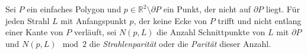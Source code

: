 \begin{definition}
    Sei $P$ ein einfaches Polygon und $p \in \mathbb{R}^2 \setminus \partial P$ ein Punkt, der nicht auf $\partial P$ liegt.
    Für jeden Strahl $L$ mit Anfangspunkt $p$, der keine Ecke von $P$ trifft und nicht entlang einer Kante von $P$ verläuft, sei $N(p,L)$ die Anzahl Schnittpunkte von $L$ mit $\partial P$ 
    und $N(p,L) \mod 2$
die \emph{Strahlenparität}
%
oder
die \emph{Parität} dieser Anzahl.
\end{definition}
